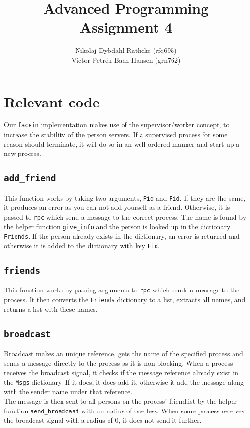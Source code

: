 \documentclass[a4paper]{article}
\author{Nikolaj Dybdahl Rathcke (rfq695) \\ Victor Petrén Bach Hansen (grn762)}
\title{Advanced Programming \\ Assignment 4}
\begin{document}
\maketitle

\section*{Relevant code}
Our \texttt{facein} implementation makes use of the supervisor/worker concept, to increase the stability of the person servers. If a supervised process for some reason should terminate, it will do so in an well-ordered manner and start up a new process.

\subsection*{\texttt{add\_friend}}
This function works by taking two arguments, \texttt{Pid} and \texttt{Fid}. If they are the same, it produces an error as you can not add yourself as a friend. Otherwise, it is passed to \texttt{rpc} which send a message to the correct process. The name is found by the helper function \texttt{give\_info} and the person is looked up in the dictionary \texttt{Friends}. If the person already exists in the dictionary, an error is returned and otherwise it is added to the dictionary with key \texttt{Fid}.

\subsection*{\texttt{friends}}
This function works by passing arguments to \texttt{rpc} which sends a message to the process. It then converts the \texttt{Friends} dictionary to a list, extracts all names, and returns a list with these names.

\subsection*{\texttt{broadcast}}
Broadcast makes an unique reference, gets the name of the specified process and sends a message directly to the process as it is non-blocking. When a process receives the broadcast signal, it checks if the message reference already exist in the \texttt{Msgs} dictionary. If it does, it does add it, otherwise it add the message along with the sender name under that reference. \\
The message is then sent to all persons on the process' friendlist by the helper function \texttt{send\_broadcast} with an radius of one less. When some process receives the broadcast signal with a radius of $0$, it does not send it further.
\end{document}

